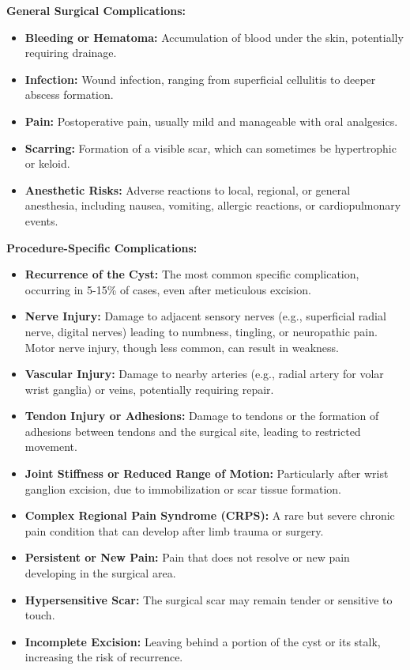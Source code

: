 \textbf{General Surgical Complications:}

\begin{itemize}
  \item \textbf{Bleeding or Hematoma:} Accumulation of blood under the skin, potentially requiring drainage.
  \item \textbf{Infection:} Wound infection, ranging from superficial cellulitis to deeper abscess formation.
  \item \textbf{Pain:} Postoperative pain, usually mild and manageable with oral analgesics.
  \item \textbf{Scarring:} Formation of a visible scar, which can sometimes be hypertrophic or keloid.
  \item \textbf{Anesthetic Risks:} Adverse reactions to local, regional, or general anesthesia, including nausea, vomiting, allergic reactions, or cardiopulmonary events.
\end{itemize}

\textbf{Procedure-Specific Complications:}

\begin{itemize}
  \item \textbf{Recurrence of the Cyst:} The most common specific complication, occurring in 5-15\% of cases, even after meticulous excision.
  \item \textbf{Nerve Injury:} Damage to adjacent sensory nerves (e.g., superficial radial nerve, digital nerves) leading to numbness, tingling, or neuropathic pain. Motor nerve injury, though less common, can result in weakness.
  \item \textbf{Vascular Injury:} Damage to nearby arteries (e.g., radial artery for volar wrist ganglia) or veins, potentially requiring repair.
  \item \textbf{Tendon Injury or Adhesions:} Damage to tendons or the formation of adhesions between tendons and the surgical site, leading to restricted movement.
  \item \textbf{Joint Stiffness or Reduced Range of Motion:} Particularly after wrist ganglion excision, due to immobilization or scar tissue formation.
  \item \textbf{Complex Regional Pain Syndrome (CRPS):} A rare but severe chronic pain condition that can develop after limb trauma or surgery.
  \item \textbf{Persistent or New Pain:} Pain that does not resolve or new pain developing in the surgical area.
  \item \textbf{Hypersensitive Scar:} The surgical scar may remain tender or sensitive to touch.
  \item \textbf{Incomplete Excision:} Leaving behind a portion of the cyst or its stalk, increasing the risk of recurrence.
\end{itemize}

